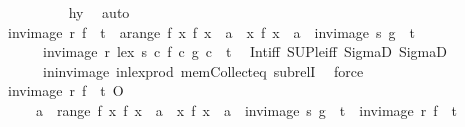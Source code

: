 \begin{isabellebody}
\ \ \ \ \ \ \ \ \isamarkupfalse%
\ hy\ \isamarkupfalse%
\ auto\isanewline
\ \ \ \ \isamarkupfalse%
\isanewline
\ \ \ \ \isamarkupfalse%
\ {\isachardoublequoteopen}inv{\isacharunderscore}{\kern0pt}image\ r\ f\ {\isasyminter}\ t\ {\isasymunion}\ {\isacharparenleft}{\kern0pt}{\isasymUnion}a{\isasymin}range\ f{\isachardot}{\kern0pt}\ {\isacharbraceleft}{\kern0pt}x{\isachardot}{\kern0pt}\ f\ x\ {\isacharequal}{\kern0pt}\ a{\isacharbraceright}{\kern0pt}\ {\isasymtimes}\ {\isacharbraceleft}{\kern0pt}x{\isachardot}{\kern0pt}\ f\ x\ {\isacharequal}{\kern0pt}\ a{\isacharbraceright}{\kern0pt}\ {\isasyminter}\ inv{\isacharunderscore}{\kern0pt}image\ s\ g\ {\isasyminter}\ t{\isacharparenright}{\kern0pt}\ {\isasymsubseteq}\ \isanewline
\ \ \ \ \ \ inv{\isacharunderscore}{\kern0pt}image\ {\isacharparenleft}{\kern0pt}r\ {\isacharless}{\kern0pt}{\isacharasterisk}{\kern0pt}lex{\isacharasterisk}{\kern0pt}{\isachargreater}{\kern0pt}\ s{\isacharparenright}{\kern0pt}\ {\isacharparenleft}{\kern0pt}{\isasymlambda}c{\isachardot}{\kern0pt}\ {\isacharparenleft}{\kern0pt}f\ c{\isacharcomma}{\kern0pt}\ g\ c{\isacharparenright}{\kern0pt}{\isacharparenright}{\kern0pt}\ {\isasyminter}\ t{\isachardoublequoteclose}\ \isamarkupfalse%
\ Int{\isacharunderscore}{\kern0pt}iff\ SUP{\isacharunderscore}{\kern0pt}le{\isacharunderscore}{\kern0pt}iff\ SigmaD{}\ SigmaD{}\ \isanewline
\ \ \ \ \ \ in{\isacharunderscore}{\kern0pt}inv{\isacharunderscore}{\kern0pt}image\ in{\isacharunderscore}{\kern0pt}lex{\isacharunderscore}{\kern0pt}prod\ mem{\isacharunderscore}{\kern0pt}Collect{\isacharunderscore}{\kern0pt}eq\ subrelI\ \isamarkupfalse%
\ force\isanewline
\ \ \isamarkupfalse%
\isanewline
\ \ \isamarkupfalse%
\ \isamarkupfalse%
\ {\isachardoublequoteopen}{\isacharparenleft}{\kern0pt}{\isacharparenleft}{\kern0pt}inv{\isacharunderscore}{\kern0pt}image\ r\ f{\isacharparenright}{\kern0pt}\ {\isasyminter}\ t{\isacharparenright}{\kern0pt}\ O\isanewline
\ \ \ \ {\isacharparenleft}{\kern0pt}{\isasymUnion}\ a\ {\isasymin}\ range\ f{\isachardot}{\kern0pt}\ {\isacharparenleft}{\kern0pt}{\isacharbraceleft}{\kern0pt}x{\isachardot}{\kern0pt}\ f\ x\ {\isacharequal}{\kern0pt}\ a{\isacharbraceright}{\kern0pt}\ {\isasymtimes}\ {\isacharbraceleft}{\kern0pt}x{\isachardot}{\kern0pt}\ f\ x\ {\isacharequal}{\kern0pt}\ a{\isacharbraceright}{\kern0pt}\ {\isasyminter}\ {\isacharparenleft}{\kern0pt}inv{\isacharunderscore}{\kern0pt}image\ s\ g{\isacharparenright}{\kern0pt}{\isacharparenright}{\kern0pt}\ {\isasyminter}\ t{\isacharparenright}{\kern0pt}\ {\isasymsubseteq}\ {\isacharparenleft}{\kern0pt}inv{\isacharunderscore}{\kern0pt}image\ r\ f{\isacharparenright}{\kern0pt}\ {\isasyminter}\ t{\isachardoublequoteclose}\isanewline

\end{isabellebody}
